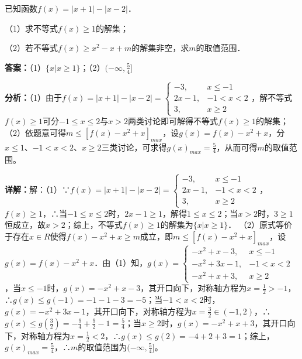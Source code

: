 \begin{question}[points=10]
[选修4-5：不等式选讲]

已知函数$f(x)=|x+1|-|x-2|$．

（1）求不等式$f(x)\ge 1$的解集；

（2）若不等式$f(x)\ge x^2-x+m$的解集非空，求$m$的取值范围．
\begin{solution}
\textbf{答案：}（1）$\{x|x\ge 1\}$；（2）$(-\infty,\frac{5}{4}]$

\textbf{分析：}（1）由于$f(x)=|x+1|-|x-2|=\begin{cases} -3, & x\le -1 \\ 2x-1, & -1<x<2 \\ 3, & x\ge 2 \end{cases}$，解不等式$f(x)\ge 1$可分$-1\le x\le 2$与$x>2$两类讨论即可解得不等式$f(x)\ge 1$的解集；
（2）依题意可得$m\le [f(x)-x^2+x]_{max}$，设$g(x)=f(x)-x^2+x$，分$x\le 1$、$-1<x<2$、$x\ge 2$三类讨论，可求得$g(x)_{max}=\frac{5}{4}$，从而可得$m$的取值范围。

\textbf{详解：}解：（1）∵$f(x)=|x+1|-|x-2|=\begin{cases} -3, & x\le -1 \\ 2x-1, & -1<x<2 \\ 3, & x\ge 2 \end{cases}$，$f(x)\ge 1$，∴当$-1\le x\le 2$时，$2x-1\ge 1$，解得$1\le x\le 2$；当$x>2$时，$3\ge 1$恒成立，故$x>2$；综上，不等式$f(x)\ge 1$的解集为$\{x|x\ge 1\}$．
（2）原式等价于存在$x\in R$使得$f(x)-x^2+x\ge m$成立，即$m\le [f(x)-x^2+x]_{max}$，设$g(x)=f(x)-x^2+x$．由（1）知，$g(x)=\begin{cases} -x^2+x-3, & x\le -1 \\ -x^2+3x-1, & -1<x<2 \\ -x^2+x+3, & x\ge 2 \end{cases}$，当$x\le -1$时，$g(x)=-x^2+x-3$，其开口向下，对称轴方程为$x=\frac{1}{2}>-1$，∴$g(x)\le g(-1)=-1-1-3=-5$；当$-1<x<2$时，$g(x)=-x^2+3x-1$，其开口向下，对称轴方程为$x=\frac{3}{2}\in(-1,2)$，∴$g(x)\le g(\frac{3}{2})=-\frac{9}{4}+\frac{9}{2}-1=\frac{5}{4}$；当$x\ge 2$时，$g(x)=-x^2+x+3$，其开口向下，对称轴方程为$x=\frac{1}{2}<2$，∴$g(x)\le g(2)=-4+2+3=1$；综上，$g(x)_{max}=\frac{5}{4}$，∴$m$的取值范围为$(-\infty,\frac{5}{4}]$。
\end{solution}
\end{question}

